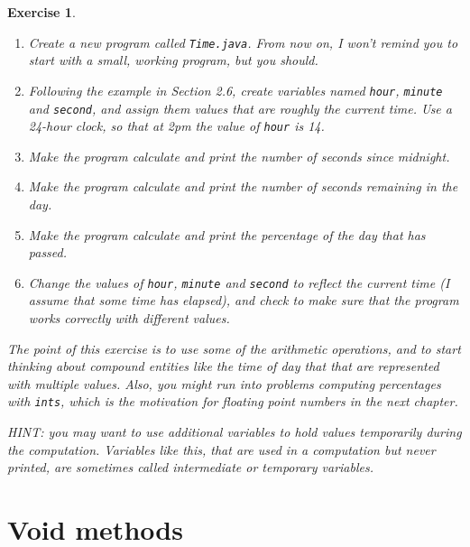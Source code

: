 \documentclass[12pt]{book}
\theoremstyle{exercise}
\newtheorem{exercise}{Exercise}[chapter]
\begin{document}
\begin{exercise}

\begin{enumerate}

\item Create a new program called {\tt Time.java}.  From now
on, I won't remind you to start with a small, working program,
but you should.

\item Following the example in Section 2.6, create variables
named {\tt hour}, {\tt minute} and {\tt second}, and assign
them values that are roughly the current time.  Use a 24-hour
clock, so that at 2pm the value of {\tt hour} is 14.

\item Make the program calculate and print the number of
seconds since midnight.

\item Make the program calculate and print the number of
seconds remaining in the day.

\item Make the program calculate and print the percentage of
the day that has passed.

\item Change the values of {\tt hour}, {\tt minute} and {\tt second}
to reflect the current time (I assume that some time has elapsed), and
check to make sure that the program works correctly with different
values.

\end{enumerate}

The point of this exercise is to use some of the arithmetic
operations, and to start thinking about compound entities like the
time of day that that are represented with multiple values.  Also,
you might run into problems computing percentages with {\tt ints},
which is the motivation for floating point numbers in the next
chapter.

HINT: you may want to use additional variables to hold values
temporarily during the computation.  Variables like this, that
are used in a computation but never printed, are sometimes called
intermediate or temporary variables.

\end{exercise}



\chapter{Void methods}
\label{chap03}
\end{document}
